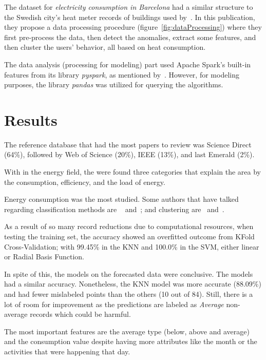 \documentclass[a4paper,12pt,twoside]{ThesisStyle}
\begin{document}
The dataset for \textit{electricity consumption in Barcelona} had a similar structure to the Swedish city's heat meter records of buildings used by~\cite{du2019clustering}. In this publication, they propose a data processing procedure (figure~\ref{fig:dataProcessing}) where they first pre-process the data, then detect the anomalies, extract some features, and then cluster the users' behavior, all based on heat consumption. 

The data analysis (processing for modeling) part used Apache Spark's built-in features from its library \textit{pyspark}, as mentioned by~\cite{liu2018scalable}. However, for modeling purposes, the library \textit{pandas} was utilized for querying the algorithms.



\chapter{Results}

The reference database that had the most papers to review was Science Direct (64\%), followed by Web of Science (20\%), IEEE (13\%), and last Emerald (2\%). 

With in the energy field, the were found three categories that explain the area by the consumption, efficiency, and the load of energy.

Energy consumption was the most studied. Some authors that have talked regarding classification methods are ~\cite{cerquitelli2017predicting} and~\cite{leiria2021using}; and clustering are~\cite{fonseca2017unsupervised} and~\cite{du2019clustering}.

As a result of so many record reductions due to computational resources, when testing the training set, the accuracy showed an overfitted outcome from KFold Cross-Validation; with 99.45\% in the KNN and 100.0\% in the SVM, either linear or Radial Basis Function.

In spite of this, the models on the forecasted data were conclusive. The models had a similar accuracy. Nonetheless, the KNN model was more accurate (88.09\%) and had fewer mislabeled points than the others (10 out of 84). Still, there is a lot of room for improvement as the predictions are labeled as \textit{Average} non-average records which could be harmful.

The most important features are the average type (below, above and average) and the consumption value despite having more attributes like the month or the activities that were happening that day.
\end{document}
